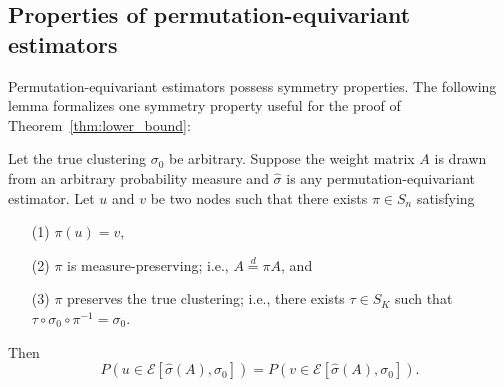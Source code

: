 \documentclass{article}
\begin{document}

\subsection{Properties of permutation-equivariant estimators}

Permutation-equivariant estimators possess symmetry properties. The following lemma formalizes one symmetry property useful for the proof of Theorem~\ref{thm:lower_bound}: 
\begin{lemma}
\label{lem:permutation_equivariance_symmetry}
Let the true clustering $\sigma_0$ be arbitrary. Suppose the weight matrix $A$ is drawn from an arbitrary probability measure and $\hat{\sigma}$ is any permutation-equivariant estimator. Let $u$ and $v$ be two nodes such that there exists $\pi \in S_n$ satisfying
\begin{itemize}
\item[(1)] $\pi(u) = v$,
\item[(2)] $\pi$ is measure-preserving; i.e., $A \stackrel{d}{=} \pi A$, and
\item[(3)] $\pi$ preserves the true clustering; i.e., there exists $\tau \in S_K$ such that $\tau \circ \sigma_0 \circ \pi^{-1} = \sigma_0$.
\end{itemize}
Then
\[
P( u \in \mathcal{E}[\hat{\sigma}(A), \sigma_0]) = P( v \in \mathcal{E}[\hat{\sigma}(A), \sigma_0] ).
\]
\end{lemma}
\end{document}
